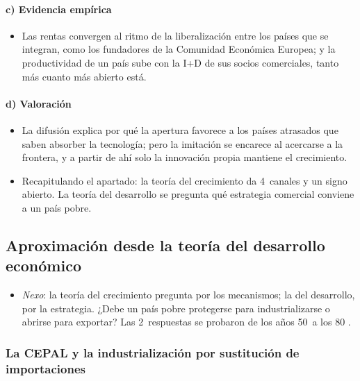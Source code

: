 \documentclass[11pt]{article}
\begin{document}
\paragraph{c) Evidencia empírica}

\begin{itemize}
\item Las rentas convergen al ritmo de la liberalización entre los países que se integran, como los fundadores de la Comunidad Económica Europea\nocite{BenDavid1993Equalizing}; y la productividad de un país sube con la I+D de sus socios comerciales, tanto más cuanto más abierto está\nocite{CoeHelpman1995International}.
\end{itemize}

\paragraph{d) Valoración}

\begin{itemize}
\item La difusión explica por qué la apertura favorece a los países atrasados que saben absorber la tecnología; pero la imitación se encarece al acercarse a la frontera, y a partir de ahí solo la innovación propia mantiene el crecimiento.
\item Recapitulando el apartado: la teoría del crecimiento da 4~canales y un signo abierto. La teoría del desarrollo se pregunta qué estrategia comercial conviene a un país pobre.
\end{itemize}

\subsection{Aproximación desde la teoría del desarrollo económico}\label{sec:desarrollo}

\begin{itemize}
\item \emph{Nexo}: la teoría del crecimiento pregunta por los mecanismos; la del desarrollo, por la estrategia. ¿Debe un país pobre protegerse para industrializarse o abrirse para exportar? Las 2~respuestas se probaron de los años 50~a los 80 .
\end{itemize}

\subsubsection{La CEPAL y la industrialización por sustitución de importaciones}\label{sec:isi}
\end{document}
